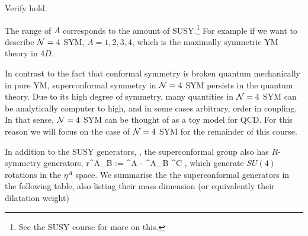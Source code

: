 \bbox 
    Verify  hold.  
\ebox 

The range of $A$ corresponds to the amount of SUSY.\footnote{See the SUSY course for more on this.} For example if we want to describe $\mathcal{N}=4$ SYM, $A=1,2,3,4$, which is the maximally symmetric YM theory in 4$D$.

In contrast to the fact that conformal symmetry is broken quantum mechanically in pure YM, superconformal symmetry in $\mathcal{N}=4$ SYM persists in the quantum theory. Due to its high degree of symmetry, many quantities in $\mathcal{N}=4$ SYM can be analytically computer to high, and in some cases arbitrary, order in coupling. In that sense, $\mathcal{N}=4$ SYM can be thought of as a toy model for QCD. For this reason we will focus on the case of $\mathcal{N}=4$ SYM for the remainder of this course. 

In addition to the SUSY generators, , the superconformal group also has $R$-symmetry generators, 
\be 
\label{eqn:RGenerator}
    {r^A}_B := \eta^{A}  -  \del^A_B \eta^C ,
\ee 
which generate $SU(4)$ rotations in the $\eta^A$ space. We summarise the the superconformal generators in the following table, also listing their mass dimension (or equivalently their dilatation weight)


